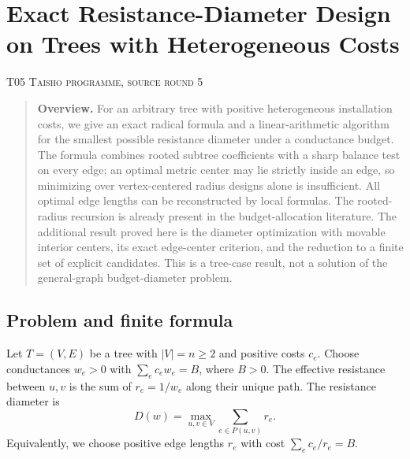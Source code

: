 \documentclass[11pt,a4paper]{article}
\theoremstyle{definition}\newtheorem{definition}[theorem]{Definition}
\theoremstyle{remark}\newtheorem{remark}[theorem]{Remark}
\numberwithin{equation}{section}
\begin{document}
\clearpage
\section[T05 --- Exact Resistance-Diameter Design on Trees with Heterogeneous Costs]{Exact Resistance-Diameter Design on Trees with Heterogeneous Costs}\label{contrib-T05}
\noindent\textsc{T05 \quad Taisho programme, source round 5}\par\medskip



\begin{quote}\small\textbf{Overview.} For an arbitrary tree with positive heterogeneous installation costs, we give an exact radical formula and a linear-arithmetic algorithm for the smallest possible resistance diameter under a conductance budget. The formula combines rooted subtree coefficients with a sharp balance test on every edge; an optimal metric center may lie strictly inside an edge, so minimizing over vertex-centered radius designs alone is insufficient. All optimal edge lengths can be reconstructed by local formulas. The rooted-radius recursion is already present in the budget-allocation literature. The additional result proved here is the diameter optimization with movable interior centers, its exact edge-center criterion, and the reduction to a finite set of explicit candidates. This is a tree-case result, not a solution of the general-graph budget-diameter problem.\end{quote}
\subsection{Problem and finite formula}\label{T05-sec-1}
Let $T=(V,E)$ be a tree with $|V|=n\ge2$ and positive costs $c_e$. Choose conductances $w_e>0$ with $\sum_ec_ew_e=B$, where $B>0$. The effective resistance between $u,v$ is the sum of $r_e=1/w_e$ along their unique path. The resistance diameter is
\[
 D(w)=\max_{u,v\in V}\sum_{e\in P(u,v)}r_e.
\]
Equivalently, we choose positive edge lengths $r_e$ with cost $\sum_ec_e/r_e=B$.
\end{document}
